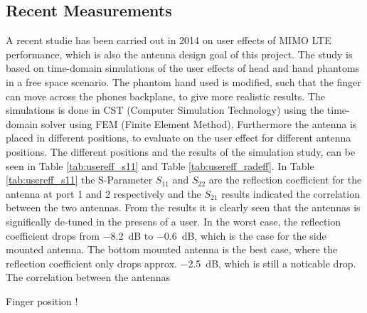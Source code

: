 \subsection{Recent Measurements}
A recent studie has been carried out in 2014 on user effects of MIMO LTE performance, which is also the antenna design goal of this project. The study is based on time-domain simulations of the user effects of head and hand phantoms in a free space scenario. The phantom hand used is modified, such that the finger can move across the phones backplane, to give more realistic results. The simulations is done in CST (Computer Simulation Technology) using the time-domain solver using FEM (Finite Element Method). Furthermore the antenna is placed in different positions, to evaluate on the user effect for different antenna positions. The different positions and the results of the simulation study, can be seen in Table \ref{tab:usereff_s11} and Table \ref{tab:usereff_radeff}. In Table \ref{tab:usereff_s11} the S-Parameter $S_{11}$ and $S_{22}$ are the reflection coefficient for the antenna at port 1 and 2 respectively and the $S_{21}$ results indicated the correlation between the two antennas. From the results it is clearly seen that the antennas is significally de-tuned in the presens of a user. In the worst case, the reflection coefficient drops from \SI{-8.2}{dB} to \SI{-0.6}{dB}, which is the case for the side mounted antenna. The bottom mounted antenna is the best case, where the reflection coefficient only drops approx. \SI{-2.5}{dB}, which is still a noticable drop. The correlation between the antennas

Finger position !    

